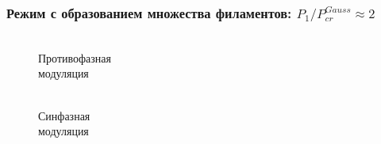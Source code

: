 \documentclass[fullscreen=true,unicode,bookmarks=true]{beamer}
\begin{document}
    \begin{frame}
        \frametitle{Режим с образованием множества филаментов: $P_{1}/P_{cr}^{Gauss} \approx 2$}

        \begin{figure}[H]
            \begin{center}
                \begin{minipage}[h]{0.49\linewidth}
                     \\ Противофазная \\ модуляция
                \end{minipage}
                \hfill
                \begin{minipage}[h]{0.49\linewidth}
                     \\ Синфазная \\ модуляция

\end{minipage}
\end{center}
\end{figure}
\end{frame}
\end{document}
